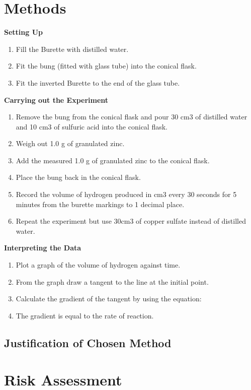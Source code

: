 \section{Methods}

\textbf{Setting Up}

\begin{enumerate}
\item Fill the Burette with distilled water.
\item Fit the bung (fitted with glass tube) into the conical flask.
\item Fit the inverted Burette to the end of the glass tube.
\end{enumerate}

\textbf{Carrying out the Experiment}

\begin{enumerate}
\item Remove the bung from the conical flask and pour 30 cm3 of distilled water and 10 cm3 of sulfuric acid into the conical flask.
\item Weigh out 1.0 g of granulated zinc.
\item Add the measured 1.0 g of granulated zinc to the conical flask.
\item Place the bung back in the conical flask.
\item Record the volume of hydrogen produced in cm3 every 30 seconds for 5 minutes from the burette markings to 1 decimal place.
\item Repeat the experiment but use 30cm3 of copper sulfate instead of distilled water.
\end{enumerate} 

\textbf{Interpreting the Data}

\begin{enumerate}
\item Plot a graph of the volume of hydrogen against time.
\item From the graph draw a tangent to the line at the initial point.
\item Calculate the gradient of the tangent by using the equation: 
\item The gradient is equal to the rate of reaction.
\end{enumerate}



	\subsection{Justification of Chosen Method}


\section{Risk Assessment}